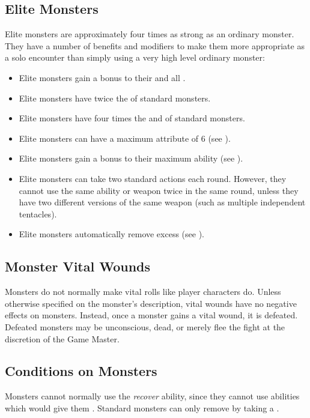     \subsection{Elite Monsters}\label{Elite Monsters}
        Elite monsters are approximately four times as strong as an ordinary monster.
        They have a number of benefits and modifiers to make them more appropriate as a solo encounter than simply using a very high level ordinary monster:
        \begin{itemize}
            \item Elite monsters gain a  bonus to their  and all .
            \item Elite monsters have twice the  of standard monsters.
            \item Elite monsters have four times the  and  of standard monsters.
            \item Elite monsters can have a maximum attribute of 6 (see ).
            \item Elite monsters gain a  bonus to their maximum ability  (see ).
            \item Elite monsters can take two standard actions each round. However, they cannot use the same ability or weapon twice in the same round, unless they have two different versions of the same weapon (such as multiple independent tentacles).
            \item Elite monsters automatically remove excess  (see ).
        \end{itemize}

        \subsection{Monster Vital Wounds}
            Monsters do not normally make vital rolls like player characters do.
            Unless otherwise specified on the monster's description, vital wounds have no negative effects on monsters.
            Instead, once a monster gains a vital wound, it is defeated.
            Defeated monsters may be unconscious, dead, or merely flee the fight at the discretion of the Game Master.

        \subsection{Conditions on Monsters}\label{Conditions on Monsters}
            Monsters cannot normally use the \textit{recover} ability, since they cannot use abilities which would give them .
            Standard monsters can only remove  by taking a .


